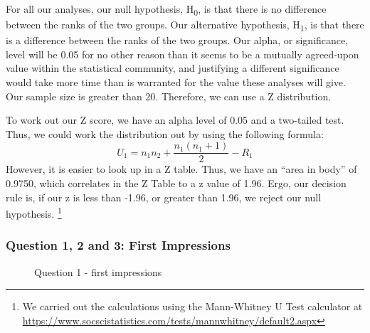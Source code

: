 For all our analyses, our null hypothesis, H\textsubscript{0}, is that there is no difference between the ranks of the two groups. 
Our alternative hypothesis, H\textsubscript{1}, is that there is a difference between the ranks of the two groups.
Our alpha, or significance, level will be 0.05 for no other reason than it seems to be a mutually agreed-upon value within the statistical community, and justifying a different significance would take more time than is warranted for the value these analyses will give.
Our sample size is greater than 20. 
Therefore, we can use a Z distribution.

To work out our Z score, we have an alpha level of 0.05 and a two-tailed test.
Thus, we could work the distribution out by using the following formula:
\[U_{1}=n_{1}n_{2}+\frac{n_{1}(n_{1}+1)}{2}-R_{1}\]
However, it is easier to look up in a Z table.
Thus, we have an ``area in body'' of 0.9750, which correlates in the Z Table to a z value of 1.96.
Ergo, our decision rule is, if our z is less than -1.96, or greater than 1.96, we reject our null hypothesis.
\footnote{We carried out the calculations using the Mann-Whitney U Test calculator at \url{https://www.socscistatistics.com/tests/mannwhitney/default2.aspx}}

\pagebreak
\subsubsection{Question 1, 2 and 3: First Impressions}

\begin{figure}[h]
    \centering
    \caption{Question 1 - first impressions}
    \label{fig:stackedbar_Q1}
\end{figure}

